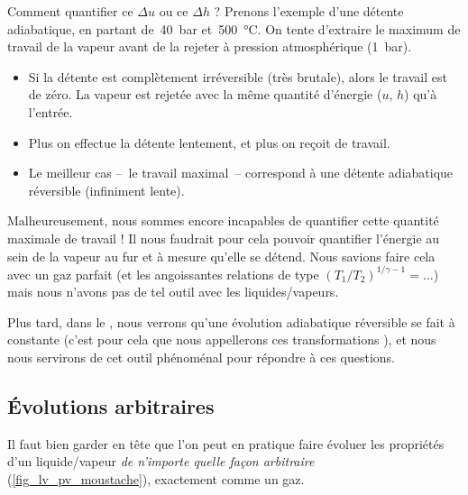 		Comment quantifier ce $\Delta u$ ou ce $\Delta h$ ? Prenons l’exemple d’une détente adiabatique, en partant de~\SI{40}{\bar} et~\SI{500}{\degreeCelsius}. On tente d’extraire le maximum de travail de la vapeur avant de la rejeter à pression atmosphérique (\SI{1}{\bar}).
		
		\begin{itemize}
			\item Si la détente est complètement irréversible (très brutale), alors le travail est de zéro. La vapeur est rejetée avec la même quantité d’énergie ($u$, $h$) qu’à l’entrée.
			\item Plus on effectue la détente lentement, et plus on reçoit de travail.
			\item Le meilleur cas --\ le travail maximal\ -- correspond à une détente adiabatique réversible (infiniment lente).
		\end{itemize}

		Malheureusement, nous sommes encore incapables de quantifier cette quantité maximale de travail ! Il nous faudrait pour cela pouvoir quantifier l’énergie au sein de la vapeur au fur et à mesure qu’elle se détend. Nous savions faire cela avec un gaz parfait (et les angoissantes relations de type $(T_1/T_2)^{1/\gamma-1} = \ldots$) mais nous n’avons pas de tel outil avec les liquides/vapeurs.


		Plus tard, dans le \courshuit, nous verrons qu’une évolution adiabatique réversible se fait à  constante (c’est pour cela que nous appellerons ces transformations ), et nous nous servirons de cet outil phénoménal pour répondre à ces questions.



	\subsection{Évolutions arbitraires}
	
		Il faut bien garder en tête que l’on peut en pratique faire évoluer les propriétés d’un liquide/vapeur \emph{de n’importe quelle façon arbitraire} (\cref{fig_lv_pv_moustache}), exactement comme un gaz.
		
